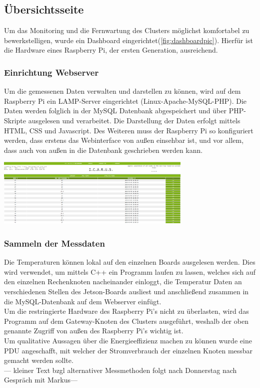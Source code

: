 \subsection{Übersichtsseite}
Um das Monitoring und die Fernwartung des Clusters möglichst komfortabel zu bewerkstelligen, wurde ein Dashboard eingerichtet(\ref{fig:dashboardpic}). Hierfür ist die Hardware eines Raspberry Pi, der ersten Generation, ausreichend.
\subsubsection{Einrichtung Webserver}
Um die gemessenen Daten verwalten und darstellen zu können, wird auf dem Raspberry Pi ein LAMP-Server eingerichtet (Linux-Apache-MySQL-PHP). Die Daten werden folglich in der MySQL Datenbank abgespeichert und über PHP-Skripte ausgelesen und verarbeitet. Die Darstellung der Daten erfolgt mittels HTML, CSS und Javascript. Des Weiteren muss der Raspberry Pi so konfiguriert werden, dass erstens das Webinterface von außen einsehbar ist, und vor allem, dass auch von außen in die Datenbank geschrieben werden kann.

\begin{minipage}{\textwidth}

\begin{center}
	\includegraphics[width=0.7\textwidth]{./Bilder/Dashboard/Dashboard_frontend.png}
	\label{fig:dashboardpic}

\end{center}	
\end{minipage}

\subsubsection{Sammeln der Messdaten}
Die Temperaturen können lokal auf den einzelnen Boards ausgelesen werden. Dies wird verwendet, um mittels C++ ein Programm laufen zu lassen, welches sich auf den einzelnen Rechenknoten nacheinander einloggt, die Temperatur Daten an verschiedenen Stellen des Jetson-Boards ausliest und anschließend zusammen in die MySQL-Datenbank auf dem Webserver einfügt.\\
Um die restringierte Hardware des Raspberry Pi's nicht zu überlasten, wird das Programm auf dem Gateway-Knoten des Clusters ausgeführt, weshalb der oben genannte Zugriff von außen des Raspberry Pi's wichtig ist. \\
Um qualitative Aussagen über die Energieeffizienz machen zu können wurde eine PDU angeschafft, mit welcher der Stromverbrauch der einzelnen Knoten messbar gemacht werden sollte. \\
--- kleiner Text bzgl alternativer Messmethoden folgt nach Donnerstag nach Gespräch mit Markus---\\

